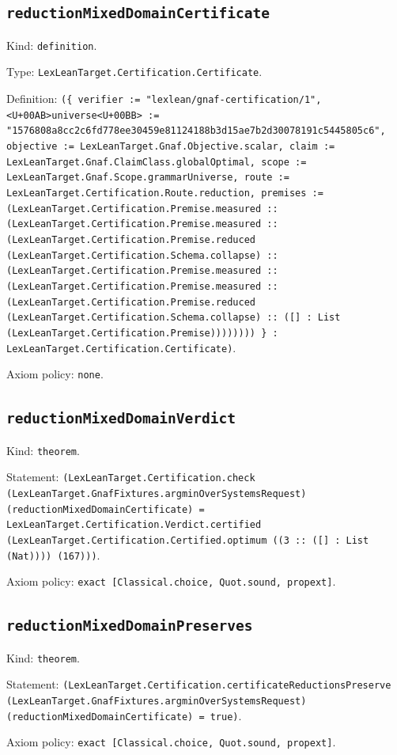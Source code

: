 \documentclass[11pt]{article}
\begin{document}
\subsection*{\texttt{reductionMixedDomainCertificate}}
\noindent Kind: \texttt{definition}.\par
\noindent Type: \texttt{LexLeanTarget.Certification.Certificate}.\par
\noindent Definition: \texttt{(\{ verifier := "lexlean/gnaf-certification/1", <U+00AB>universe<U+00BB> := "1576808a8cc2c6fd778ee30459e81124188b3d15ae7b2d30078191c5445805c6", objective := LexLeanTarget.Gnaf.Objective.scalar, claim := LexLeanTarget.Gnaf.ClaimClass.globalOptimal, scope := LexLeanTarget.Gnaf.Scope.grammarUniverse, route := LexLeanTarget.Certification.Route.reduction, premises := (LexLeanTarget.Certification.Premise.measured :: (LexLeanTarget.Certification.Premise.measured :: (LexLeanTarget.Certification.Premise.reduced (LexLeanTarget.Certification.Schema.collapse) :: (LexLeanTarget.Certification.Premise.measured :: (LexLeanTarget.Certification.Premise.measured :: (LexLeanTarget.Certification.Premise.reduced (LexLeanTarget.Certification.Schema.collapse) :: ([] : List (LexLeanTarget.Certification.Premise)))))))) \} : LexLeanTarget.Certification.Certificate)}.\par
\noindent Axiom policy: \texttt{none}.\par
\subsection*{\texttt{reductionMixedDomainVerdict}}
\noindent Kind: \texttt{theorem}.\par
\noindent Statement: \texttt{(LexLeanTarget.Certification.check (LexLeanTarget.GnafFixtures.argminOverSystemsRequest) (reductionMixedDomainCertificate) = LexLeanTarget.Certification.Verdict.certified (LexLeanTarget.Certification.Certified.optimum ((3 :: ([] : List (Nat)))) (167)))}.\par
\noindent Axiom policy: \texttt{exact [Classical.choice, Quot.sound, propext]}.\par
\subsection*{\texttt{reductionMixedDomainPreserves}}
\noindent Kind: \texttt{theorem}.\par
\noindent Statement: \texttt{(LexLeanTarget.Certification.certificateReductionsPreserve (LexLeanTarget.GnafFixtures.argminOverSystemsRequest) (reductionMixedDomainCertificate) = true)}.\par
\noindent Axiom policy: \texttt{exact [Classical.choice, Quot.sound, propext]}.\par
\end{document}

